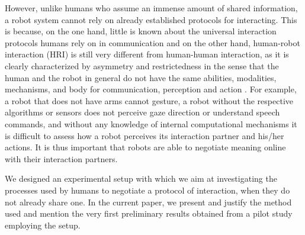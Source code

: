 However, unlike humans who assume an immense amount of shared information, a robot system cannot rely on already established protocols for interacting. This is because, on the one hand, little is known about the universal interaction protocols humans rely on in communication and on the other hand, human-robot interaction (HRI) is still very different from human-human interaction, as it is clearly characterized by asymmetry and restrictedness in the sense that the human and the robot in general do not have the same abilities, modalities, mechanisms, and body for communication, perception and action \cite{lohse2010investigating}. For example, a robot that does not have arms cannot gesture, a robot without the respective algorithms or sensors does not perceive gaze direction or understand speech commands, and without any knowledge of internal computational mechanisms it is difficult to assess how a robot perceives its interaction partner and his/her actions. It is thus important that robots are able to negotiate meaning online with their interaction partners.


We designed an experimental setup with which we aim at investigating the processes used by humans to negotiate a protocol of interaction, when they do not already share one. 
In the current paper, we present and justify the method used and mention the very first preliminary results obtained from a pilot study employing the setup.


